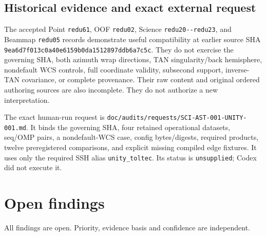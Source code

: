 \documentclass[11pt]{article}
\newcommand{\code}[1]{\nolinkurl{#1}}
\newcommand{\status}[1]{\nolinkurl{#1}}
\begin{document}
\subsection{Historical evidence and exact external request}

The accepted Point \code{redu61}, OOF \code{redu02}, Science
\code{redu20--redu23}, and Beammap \code{redu05} records demonstrate useful
compatibility at earlier source SHA \code{9ea6d7f013c0a40e6159b0da1512897ddb6a7c5c}.
They do not exercise the governing SHA, both azimuth wrap directions, TAN
singularity/back hemisphere, nondefault WCS controls, full coordinate validity,
subsecond support, inverse-TAN covariance, or complete provenance. Their raw
content and original ordered authoring sources are also incomplete. They do not
authorize a new interpretation.

The exact human-run request is
\code{doc/audits/requests/SCI-AST-001-UNITY-001.md}. It binds the governing SHA,
four retained operational datasets, seq/OMP pairs, a nondefault-WCS case,
config bytes/digests, required products, twelve preregistered comparisons, and
explicit missing compiled edge fixtures. It uses only the required SSH alias
\code{unity_toltec}. Its status is \status{unsupplied}; Codex did not execute it.

\section{Open findings}

All findings are open. Priority, evidence basis and confidence are independent.
\end{document}
